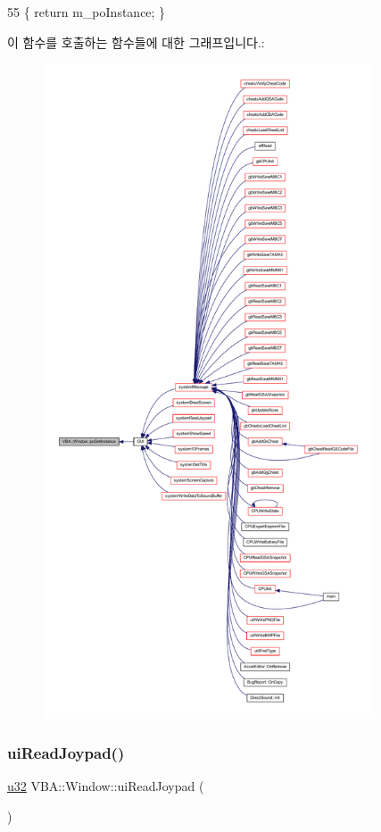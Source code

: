 \begin{DoxyCode}
55 \{ \textcolor{keywordflow}{return} m\_poInstance; \}
\end{DoxyCode}
이 함수를 호출하는 함수들에 대한 그래프입니다.\+:
\nopagebreak
\begin{figure}[H]
\begin{center}
\leavevmode
\includegraphics[height=550pt]{class_v_b_a_1_1_window_a8e084a0514c78b2c93013c3fb9e2e6e9_icgraph}
\end{center}
\end{figure}
\mbox{\label{class_v_b_a_1_1_window_ad5768e6fccecbcc761de003ae915684b}} 
\subsubsection{\texorpdfstring{ui\+Read\+Joypad()}{uiReadJoypad()}}
{\footnotesize\ttfamily \mbox{\hyperlink{_system_8h_a10e94b422ef0c20dcdec20d31a1f5049}{u32}} V\+B\+A\+::\+Window\+::ui\+Read\+Joypad (\begin{DoxyParamCaption}{ }\end{DoxyParamCaption})}



